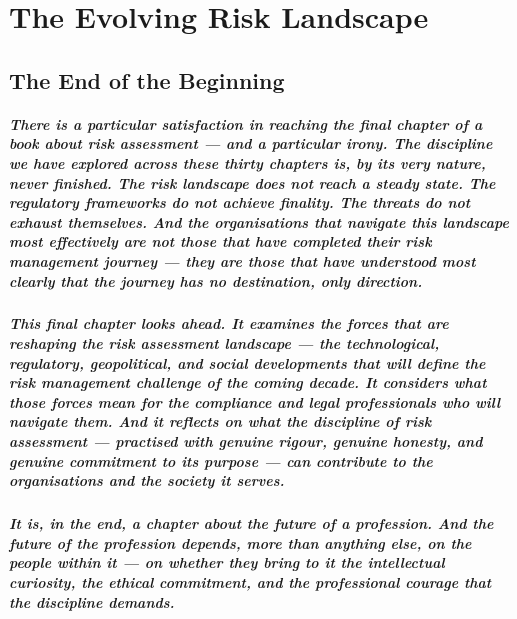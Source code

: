 \chapter{The Evolving Risk Landscape}
\label{chap:The Evolving Risk Landscape}

\section{The End of the Beginning}
\paragraph{There is a particular satisfaction in reaching the final chapter of a book about risk assessment — and a particular irony. The discipline we have explored across these thirty chapters is, by its very nature, never finished. The risk landscape does not reach a steady state. The regulatory frameworks do not achieve finality. The threats do not exhaust themselves. And the organisations that navigate this landscape most effectively are not those that have completed their risk management journey — they are those that have understood most clearly that the journey has no destination, only direction.}
\paragraph{This final chapter looks ahead. It examines the forces that are reshaping the risk assessment landscape — the technological, regulatory, geopolitical, and social developments that will define the risk management challenge of the coming decade. It considers what those forces mean for the compliance and legal professionals who will navigate them. And it reflects on what the discipline of risk assessment — practised with genuine rigour, genuine honesty, and genuine commitment to its purpose — can contribute to the organisations and the society it serves.}
\paragraph{It is, in the end, a chapter about the future of a profession. And the future of the profession depends, more than anything else, on the people within it — on whether they bring to it the intellectual curiosity, the ethical commitment, and the professional courage that the discipline demands.}

